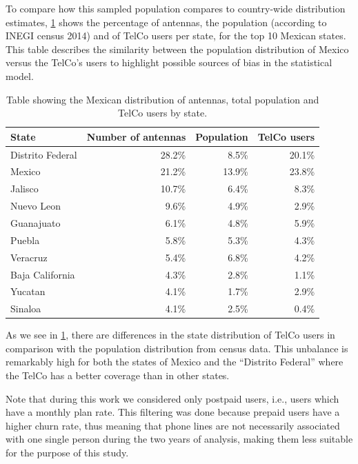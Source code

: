 To compare how this sampled population compares to country-wide distribution estimates,
\cref{tab:distribution_by_state} shows the percentage of antennas, the population (according to INEGI census 2014) and
of TelCo users per state, for the top 10 Mexican states.
This table describes the similarity between the population distribution of Mexico versus the TelCo's users to highlight possible sources of bias in the statistical model.


\begin{table}[ht]
	\caption{Table showing the Mexican distribution of antennas, total population and TelCo users by state.}\label{tab:distribution_by_state}
	\centering
	\begin{tabular}{l r r r}
		\toprule
		State				& Number of antennas & Population 	& TelCo users \\
		\midrule
		Distrito Federal      & 28.2\% 	& 8.5\%		& 20.1\%   \\
		Mexico                     & 21.2\%		&   13.9\% 	& 23.8\%   \\
		Jalisco                   & 10.7\% 	& 6.4\%		& 8.3\%    \\
		Nuevo Leon               & 9.6\%	& 4.9\%		& 2.9\% \\
		Guanajuato               & 6.1\%	& 4.8\%		& 5.9\% \\
		Puebla                     & 5.8\%	& 5.3\%		& 4.3\% \\
		Veracruz                  & 5.4\% 	& 6.8\%		& 4.2\% \\
		Baja California       & 4.3\%	& 2.8\%		& 1.1\% \\
		Yucatan                   & 4.1\%	& 1.7\%		& 2.9\% \\
		Sinaloa                   & 4.1\%	& 2.5\%		& 0.4\% \\
		\bottomrule
	\end{tabular}
\end{table}

As we see in \cref{tab:distribution_by_state}, there are differences in the state distribution of TelCo users in comparison with the population distribution from census data.
This unbalance is remarkably high for both the states of Mexico and the ``Distrito Federal'' where the TelCo has a better coverage than in other states.

Note that during this work we considered only postpaid users, i.e., users which have a monthly plan rate.
This filtering was done because prepaid users have a higher churn rate, thus meaning that phone lines are not necessarily associated with one single person during the two years of analysis, making them less suitable for the purpose of this study.

